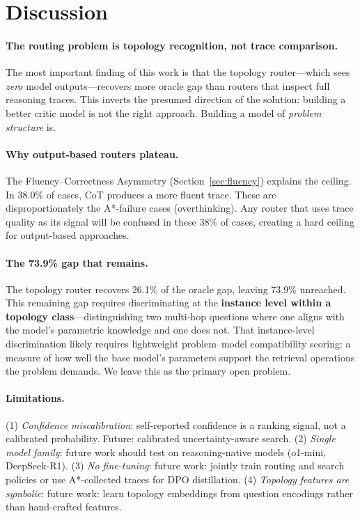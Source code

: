 \documentclass[11pt]{article}
\begin{document}
\section{Discussion}
\label{sec:discussion}

\paragraph{The routing problem is topology recognition, not trace comparison.}
The most important finding of this work is that the topology router—which sees \emph{zero} model outputs—recovers more oracle gap than routers that inspect full reasoning traces. This inverts the presumed direction of the solution: building a better critic model is not the right approach. Building a model of \emph{problem structure} is.

\paragraph{Why output-based routers plateau.}
The Fluency--Correctness Asymmetry (Section~\ref{sec:fluency}) explains the ceiling. In 38.0\% of cases, CoT produces a more fluent trace. These are disproportionately the A*-failure cases (overthinking). Any router that uses trace quality as its signal will be confused in these 38\% of cases, creating a hard ceiling for output-based approaches.

\paragraph{The 73.9\% gap that remains.}
The topology router recovers 26.1\% of the oracle gap, leaving 73.9\% unreached. This remaining gap requires discriminating at the \textbf{instance level within a topology class}—distinguishing two multi-hop questions where one aligns with the model's parametric knowledge and one does not. That instance-level discrimination likely requires lightweight problem--model compatibility scoring: a measure of how well the base model's parameters support the retrieval operations the problem demands. We leave this as the primary open problem.

\paragraph{Limitations.}
(1) \textit{Confidence miscalibration}: self-reported confidence is a ranking signal, not a calibrated probability. Future: calibrated uncertainty-aware search. (2) \textit{Single model family}: future work should test on reasoning-native models (o1-mini, DeepSeek-R1). (3) \textit{No fine-tuning}: future work: jointly train routing and search policies or use A*-collected traces for DPO distillation. (4) \textit{Topology features are symbolic}: future work: learn topology embeddings from question encodings rather than hand-crafted features.
\end{document}
